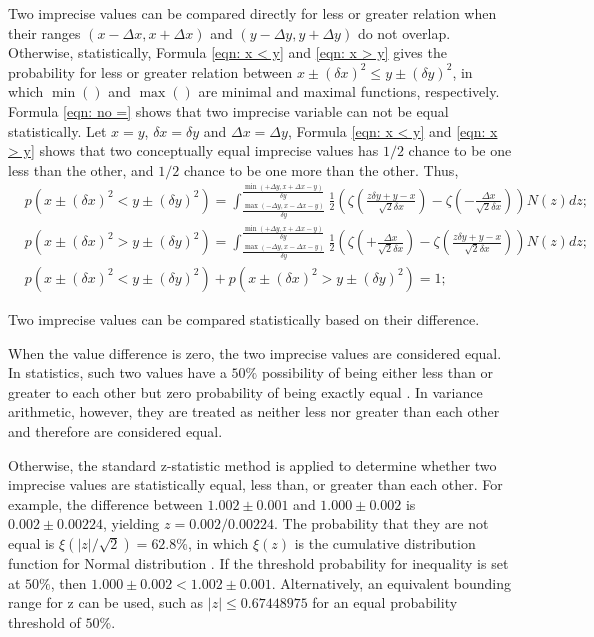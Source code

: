 \documentclass[twoside]{article}
\numberwithin{equation}{section}
\begin{document}
Two imprecise values can be compared directly for less or greater relation when their ranges $(x - \Delta x, x + \Delta x)$ and $(y - \Delta y, y + \Delta y)$ do not overlap. 
Otherwise, statistically, Formula \eqref{eqn: x < y} and \eqref{eqn: x > y} gives the probability for less or greater relation between $x \pm (\delta x)^2 \le y \pm (\delta y)^2$, in which $\min()$ and $\max()$ are minimal and maximal functions, respectively.
Formula \eqref{eqn: no =} shows that two imprecise variable can not be equal statistically.
Let $x = y$, $\delta x = \delta y$ and $\Delta x = \Delta y$, Formula \eqref{eqn: x < y} and \eqref{eqn: x > y} shows that two conceptually equal imprecise values has $1/2$ chance to be one less than the other, and $1/2$ chance to be one more than the other.
Thus,
\begin{align}
\label{eqn: x < y}
& p\left( x \pm (\delta x)^2 < y \pm (\delta y)^2 \right) = 
  \int_{\frac{\max(-\Delta y, x - \Delta x - y)}{\delta y}}^{\frac{\min(+\Delta y, x + \Delta x - y)}{\delta y}} 
      \frac{1}{2} \left(\zeta(\frac{z \delta y + y - x}{\sqrt{2} \delta x}) - \zeta(-\frac{\Delta x}{\sqrt{2} \delta x})\right) N(z) d z; \\
\label{eqn: x > y}
& p\left( x \pm (\delta x)^2 > y \pm (\delta y)^2 \right) =     
  \int_{\frac{\max(-\Delta y, x - \Delta x - y)}{\delta y}}^{\frac{\min(+\Delta y, x + \Delta x - y)}{\delta y}} 
      \frac{1}{2} \left(\zeta(+\frac{\Delta x}{\sqrt{2} \delta x}) - \zeta(\frac{z \delta y + y - x}{\sqrt{2} \delta x})\right) N(z) d z; \\
\label{eqn: no =}
& p\left( x \pm (\delta x)^2 < y \pm (\delta y)^2 \right) + p\left( x \pm (\delta x)^2 > y \pm (\delta y)^2 \right) = 1;
\end{align}

\fi

Two imprecise values can be compared statistically based on their difference.

When the value difference is zero, the two imprecise values are considered equal.  
In statistics, such two values have a $50\%$ possibility of being either less than or greater to each other but zero probability of being exactly equal \cite{Probability_Statistics}.
In variance arithmetic, however, they are treated as neither less nor greater than each other and therefore are considered equal.

Otherwise, the standard z-statistic method \cite{Probability_Statistics} is applied to determine whether two imprecise values are statistically equal, less than, or greater than each other.
For example, the difference between $1.002 \pm 0.001$ and $1.000 \pm 0.002$ is $0.002 \pm 0.00224$, yielding $z = 0.002 / 0.00224$.
The probability that they are not equal is $\xi(|z|/\sqrt{2}) = 62.8\%$, in which $\xi(z)$ is the cumulative distribution function for Normal distribution \cite{Probability_Statistics}.
If the threshold probability for inequality is set at $50\%$, then $1.000 \pm 0.002 < 1.002 \pm 0.001$.
Alternatively, an equivalent bounding range for z can be used, such as $|z| \leq 0.67448975$ for an equal probability threshold of $50\%$.
\end{document}
